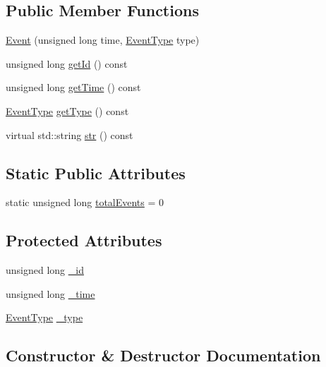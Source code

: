 \subsection*{Public Member Functions}
\begin{DoxyCompactItemize}
\item 
\hyperlink{class_event_a81ced98f0e668acac3d43d2198981b33}{Event} (unsigned long time, \hyperlink{_event_type_8h_a2628ea8d12e8b2563c32f05dc7fff6fa}{Event\+Type} type)
\item 
unsigned long \hyperlink{class_event_a973b98b35d66d83449ee370f17b8f987}{get\+Id} () const 
\item 
unsigned long \hyperlink{class_event_a3068db436fce856e0499edcd1eb88a3d}{get\+Time} () const 
\item 
\hyperlink{_event_type_8h_a2628ea8d12e8b2563c32f05dc7fff6fa}{Event\+Type} \hyperlink{class_event_ab0c2e30730d5859851f3126258c0126e}{get\+Type} () const 
\item 
virtual std\+::string \hyperlink{class_event_abf16ed4a9c78514c704ce2de6a2b9ec7}{str} () const 
\end{DoxyCompactItemize}
\subsection*{Static Public Attributes}
\begin{DoxyCompactItemize}
\item 
static unsigned long \hyperlink{class_event_af56653a3bf07521930251f7f93391cef}{total\+Events} = 0
\end{DoxyCompactItemize}
\subsection*{Protected Attributes}
\begin{DoxyCompactItemize}
\item 
unsigned long \hyperlink{class_event_a3a2f9bab41280ee0d767ec8390b1812a}{\+\_\+id}
\item 
unsigned long \hyperlink{class_event_a07e28c531b6374af308c059990938bf5}{\+\_\+time}
\item 
\hyperlink{_event_type_8h_a2628ea8d12e8b2563c32f05dc7fff6fa}{Event\+Type} \hyperlink{class_event_ac39a6517d8bfadbb3bbaf97a077a5cdf}{\+\_\+type}
\end{DoxyCompactItemize}


\subsection{Constructor \& Destructor Documentation}
\hypertarget{class_event_a81ced98f0e668acac3d43d2198981b33}{}
